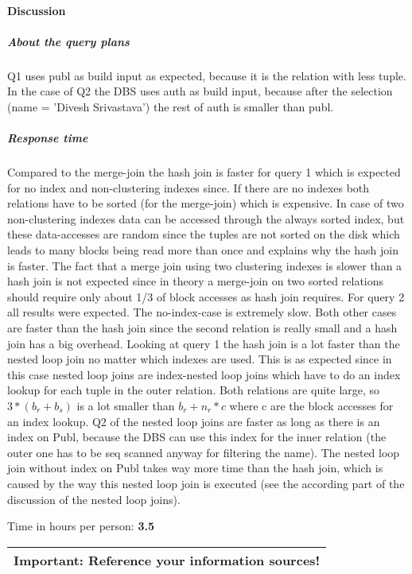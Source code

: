 \documentclass[11pt]{scrartcl}
\begin{document}
\paragraph{Discussion}
\subparagraph{About the query plans}
Q1 uses publ as build input as expected, because it is the relation with less tuple.
In the case of Q2 the DBS uses auth as build input, because after the selection (name = 'Divesh Srivastava') the rest of auth is smaller than publ.\\
\subparagraph{Response time}
Compared to the merge-join the hash join is faster for query 1 which is expected for no index and non-clustering indexes since. If there are no indexes both relations have to be sorted (for the merge-join) which is expensive. In case of two non-clustering indexes data can be accessed through the always sorted index, but these data-accesses are random since the tuples are not sorted on the disk which leads to many blocks being read more than once and explains why the hash join is faster. The fact that a merge join using two clustering indexes is slower than a hash join is not expected since in theory a merge-join on two sorted relations should require only about 1/3 of block accesses as hash join requires.
For query 2 all results were expected. The no-index-case is extremely slow. Both other cases are faster than the hash join since the second relation is really small and a hash join has a big overhead.
Looking at query 1 the hash join is a lot faster than the nested loop join no matter which indexes are used. This is as expected since in this case nested loop joins are index-nested loop joins which have to do an index lookup for each tuple in the outer relation. Both relations are quite large, so $3 * (b_r + b_s)$ is a lot smaller than $b_r + n_r * c$ where c are the block accesses for an index lookup.
Q2 of the nested loop joins are faster as long as there is an index on Publ, because the DBS can use this index for the inner relation (the outer one has to be seq scanned anyway for filtering the name). The nested loop join without index on Publ takes way more time than the hash join, which is caused by the way this nested loop join is executed (see the according part of the discussion of the nested loop joins).

\bigskip

\noindent Time in hours per person: {\bf 3.5}

\bigskip

\begin{center}
  \begin{tabular}{c}
    \hline
    {\bf Important:} Reference your information sources!
    \\\hline
  \end{tabular}
\end{center}
\end{document}

